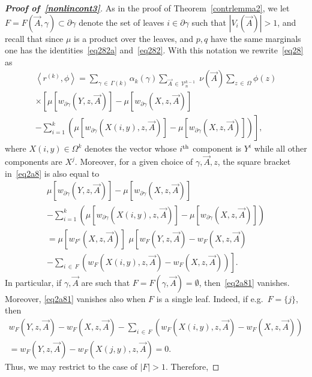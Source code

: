\documentclass[AHL,Unicode,longabstracts,published]{cedram}
\newcommand{\cV}{\mathcal{V}}
\let\g=\gamma
\let\O=\Omega
\begin{document}
\begin{proof}[{\bf Proof of~\eqref{nonlincont3}}]
As in the proof of Theorem~\ref{contrlemma2}, we let $F=F(\vec A,\g)\subset \partial \g$ denote the set of leaves $i\in \partial \g$ such that $|V_i(\vec A)|> 1$, and recall that since $\mu$ is a product over the leaves, and $p,q$ have the same marginals one has the identities~\eqref{eq282a} and~\eqref{eq282}. With this notation we rewrite~\eqref{eq28} as
\begin{multline}\label{eq2a8}
 \left\langle r^{(k)},\phi\right\rangle =\sum_{\gamma\,\in\,\Gamma(k)}\alpha_k(\gamma)
\sum_{\vec A\,\in\,\cV_n^{k-1}}\;\nu(\vec A)\sum_{z\,\in\,\Omega} \phi(z)\\
 \times \left[
\mu\left[w_{\partial \g}\left(Y,z,\vec A\right)\right] - \mu\left[w_{\partial \g}\left(X,z,\vec A\right)\right]\right.\\
-\left. \sum_{i=1}^k\left(\mu\left[w_{\partial \g}\left(X(i,y),z,\vec A\right)\right] - \mu\left[w_{\partial \g}\left(X,z,\vec A\right)\right]
\right)\right],
\end{multline}
where $X(i,y)\in\O^k$ denotes the vector whose $i^{\rm th}$ component is $Y^i$ while all other components are $X^j$. Moreover, for a given choice of $\g,\vec A, z$, the square bracket in~\eqref{eq2a8} is also equal to
\begin{multline}\label{eq2a81}
\mu\left[w_{\partial \g}\left(Y,z,\vec A\right)\right] - \mu\left[w_{\partial \g}\left(X,z,\vec A\right)\right] \\
- \sum_{i=1}^k\left(\mu\left[w_{\partial \g}\left(X(i,y),z,\vec A\right)\right] - \mu\left[w_{\partial \g}\left(X,z,\vec A\right)\right]
\right) \\
 = \mu\left[w_{F^c} \left(X,z,\vec A\right)\right]\,\,\mu\left[w_F \left(Y,z,\vec A\right)-w_F \left(X,z,\vec A\right)\right.\\
\left. -\sum_{i\,\in\,F}
\left(w_{F}\left(X(i,y),z,\vec A\right) - w_{F}\left(X,z,\vec A\right)
\right)\right].
\end{multline}
In particular, if $\g,\vec A$ are such that $F=F(\g,\vec A)=\emptyset$, then~\eqref{eq2a81} vanishes. Moreover, \eqref{eq2a81} vanishes also when $F$ is a single leaf. Indeed, if e.g.\ $F=\{j\}$, then
\begin{multline}\label{eq2a83}
w_F \left(Y,z,\vec A\right)-w_F \left(X,z,\vec A\right)-\sum_{i\,\in\,F}
\left(w_{F}\left(X(i,y),z,\vec A\right) - w_{F}\left(X,z,\vec A\right)
\right)\\
=w_F \left(Y,z,\vec A\right)- w_{F}\left(X(j,y),z,\vec A\right) = 0.
\end{multline}
Thus, we may restrict to the case of $|F|>1$. Therefore,

\end{proof}
\end{document}
